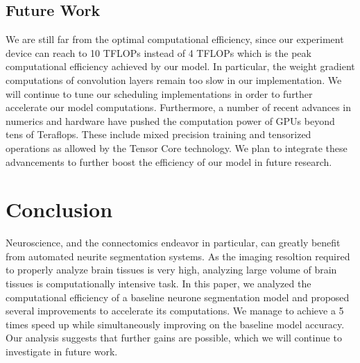 \documentclass[runningheads]{llncs}
\begin{document}
\subsection{Future Work}

We are still far from the optimal computational efficiency, 
since our experiment device can reach to 10 TFLOPs instead of 4 TFLOPs which is the peak computational efficiency achieved by our model.
In particular, the weight gradient computations of convolution layers remain too slow in our implementation.
We will continue to tune our scheduling implementations in order to further accelerate our model computations.
Furthermore, a number of recent advances in numerics and hardware have pushed the computation 
power of GPUs beyond tens of Teraflops.
These include mixed precision training and tensorized operations as allowed by the Tensor Core technology.
We plan to integrate these advancements to further boost the efficiency of our model in future research.

\section{Conclusion}

Neuroscience, and the connectomics endeavor in particular, can greatly benefit from automated neurite segmentation systems.
As the imaging resoltion required to properly analyze brain tissues is very high, analyzing large volume of brain tissues is computationally intensive task.
In this paper, we analyzed the computational efficiency of a baseline neurone segmentation model and proposed several improvements to accelerate its computations.
We manage to achieve a 5 times speed up while simultaneously improving on the baseline model accuracy.
Our analysis suggests that further gains are possible, which we will continue to investigate in future work.
%


%



%





%

%
%
%
%
%
%

%
\end{document}

